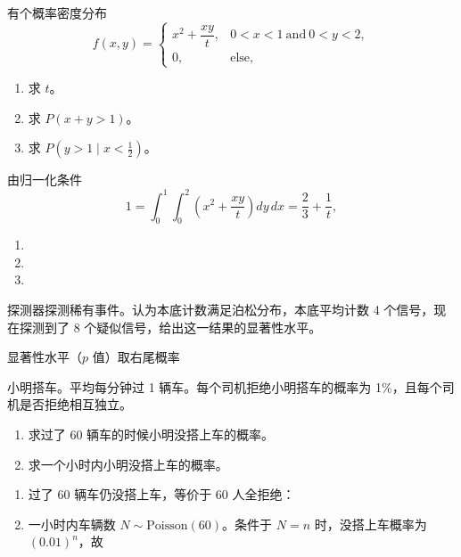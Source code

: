 \begin{question}
有个概率密度分布
\[
f(x,y)=\begin{cases}
x^2+\dfrac{xy}{t},&0<x<1\ \text{and}\ 0<y<2,\\
0,&\text{else},
\end{cases}
\]
\begin{enumerate}
\item 求 $t$。
\item 求 $P(x+y>1)$。
\item 求 $P(y>1\mid x<\frac12)$。
\end{enumerate}
\begin{solution}
由归一化条件
\[
1=\int_0^1\int_0^2\left(x^2+\frac{xy}{t}\right)dy\,dx
=\frac23+\frac1t,
\]
\begin{enumerate}
\item {}
\item
{}
\item
{}
\end{enumerate}
\end{solution}
\end{question}

\begin{question}
探测器探测稀有事件。认为本底计数满足泊松分布，本底平均计数 4 个信号，现在探测到了 8 个疑似信号，给出这一结果的显著性水平。
\begin{solution}
显著性水平（$p$ 值）取右尾概率
\end{solution}
\end{question}

\begin{question}
小明搭车。平均每分钟过 1 辆车。每个司机拒绝小明搭车的概率为 1\%，且每个司机是否拒绝相互独立。
\begin{enumerate}
\item 求过了 60 辆车的时候小明没搭上车的概率。
\item 求一个小时内小明没搭上车的概率。
\end{enumerate}
\begin{solution}
\begin{enumerate}
\item 过了 $60$ 辆车仍没搭上车，等价于 $60$ 人全拒绝：
\item 一小时内车辆数 $N\sim \mathrm{Poisson}(60)$。条件于 $N=n$ 时，没搭上车概率为 $(0.01)^n$，故
\end{enumerate}
\end{solution}
\end{question}


